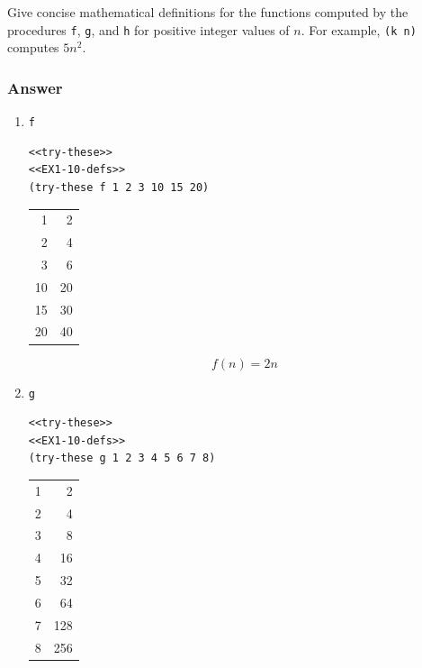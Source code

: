 \documentclass[final,fleqn,titlepage,twoside]{article}
\begin{document}
Give concise mathematical definitions for the functions computed by the
procedures \texttt{f}, \texttt{g}, and \texttt{h} for positive integer
values of \(n\). For example, \texttt{(k n)} computes \(5n^2\).

\subsubsection{Answer}
\label{sec:org9846e10}
\begin{enumerate}
\item \texttt{f}
\label{sec:org5e7d167}
\begin{verbatim}
<<try-these>>
<<EX1-10-defs>>
(try-these f 1 2 3 10 15 20)
\end{verbatim}

\begin{center}
\begin{tabular}{rr}
1 & 2\\[0pt]
2 & 4\\[0pt]
3 & 6\\[0pt]
10 & 20\\[0pt]
15 & 30\\[0pt]
20 & 40\\[0pt]
\end{tabular}
\end{center}

\[
f(n)=2n
\]

\item \texttt{g}
\label{sec:org2edf455}
\begin{verbatim}
<<try-these>>
<<EX1-10-defs>>
(try-these g 1 2 3 4 5 6 7 8)
\end{verbatim}

\begin{center}
\begin{tabular}{rr}
1 & 2\\[0pt]
2 & 4\\[0pt]
3 & 8\\[0pt]
4 & 16\\[0pt]
5 & 32\\[0pt]
6 & 64\\[0pt]
7 & 128\\[0pt]
8 & 256\\[0pt]
\end{tabular}
\end{center}


\end{enumerate}
\end{document}
